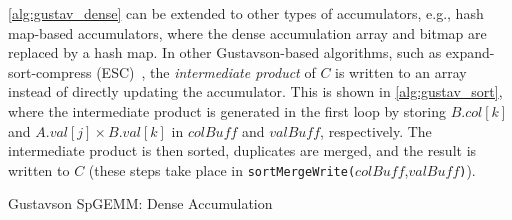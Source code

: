 \autoref{alg:gustav_dense} can be extended to other types of accumulators, e.g., hash map-based accumulators, where the dense accumulation array and bitmap are replaced by a hash map.
In other Gustavson-based algorithms, such as expand-sort-compress (ESC)~\cite{ESC,pbSpGEMM}, the \emph{intermediate product} of $C$ is written to an array instead of directly updating the accumulator.
This is shown in \autoref{alg:gustav_sort},
where the intermediate product is generated in the first loop by storing $B.col[k]$ and $A.val[j] \times  B.val[k]$ in 
$colBuff$ and $valBuff$, respectively.
The intermediate product is then sorted, duplicates are merged, and the result is written to $C$ (these steps take place in \texttt{sortMergeWrite(}$colBuff$,$valBuff$\texttt{)}).

\begin{algorithm}[htbp]
    \small
    \caption{Gustavson SpGEMM: Dense Accumulation}\label{alg:gustav_dense}
    \DontPrintSemicolon
\end{algorithm}

